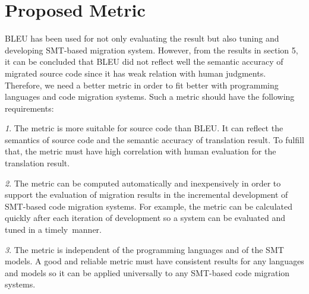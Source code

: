 \section{Proposed Metric}



BLEU has been used for not only evaluating the result but also tuning
and developing SMT-based migration system.
However, from the results in section 5, it can be concluded that BLEU
did not reflect well the semantic accuracy of migrated source code
since it has weak relation with human judgments. Therefore, we need a
better metric in order to fit better with programming languages and
code migration systems.
%
Such a metric should have the following requirements:


\emph{1}. The metric is more suitable for source code than BLEU. It
can reflect the semantics of source code and the semantic accuracy of
translation result. To fulfill that, the metric must have high
correlation with human evaluation for the translation result.


\emph{2}. The metric can be computed automatically and inexpensively in
order to support the evaluation of migration results in the
incremental development of SMT-based code migration systems. For
example, the metric can be calculated quickly after each iteration of
development so a system can be evaluated and tuned in a timely~manner.

\emph{3}. The metric is independent of the programming languages and
of the SMT models. A good and reliable metric must have consistent
results for any languages and models so it can be applied universally
to any SMT-based code migration systems.

